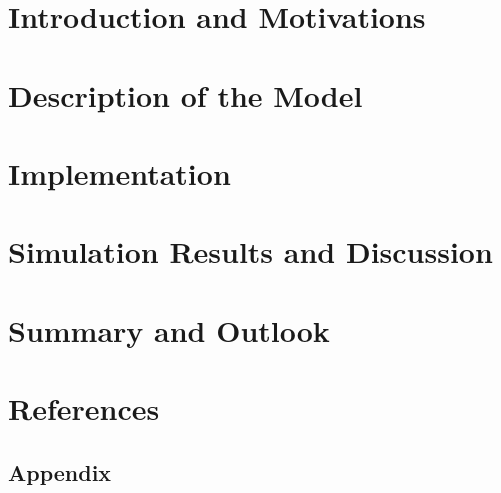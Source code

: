 \documentclass[11pt]{article}
\begin{document}
\section{Introduction and Motivations}

\newpage

\section{Description of the Model}

\newpage

\section{Implementation}

\newpage

\section{Simulation Results and Discussion}

\newpage

\section{Summary and Outlook}

\newpage

\section{References}


\newpage


\newpage
\begin{appendix}
\section{Appendix}


\end{appendix}



\end{document}

